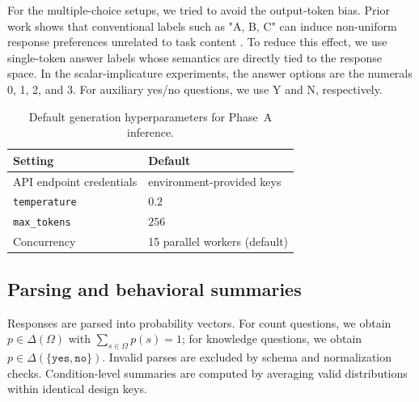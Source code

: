 \documentclass[11pt]{article}
\begin{document}
For the multiple-choice setups, we tried to avoid the output-token bias. Prior work shows that conventional
 labels such as "A, B, C" can induce non-uniform response preferences unrelated to task 
 content \cite{zheng_large_2023}. To reduce this effect, we use single-token answer labels whose 
 semantics are directly tied to the response space. In the scalar-implicature experiments, the answer 
 options are the numerals 0, 1, 2, and 3. For auxiliary yes/no questions, we use Y and N, respectively.


\begin{table}[t]

  \centering

  \footnotesize

  \setlength{\tabcolsep}{3pt}

  \renewcommand{\arraystretch}{0.92}

  \begin{tabularx}{\linewidth}{@{}lX@{}}

    \toprule

    \textbf{Setting} & \textbf{Default} \\

    \midrule

    API endpoint credentials & environment-provided keys \\

    \texttt{temperature} & $0.2$ \\

    \texttt{max\_tokens} & $256$ \\

    Concurrency & 15 parallel workers (default) \\

    \bottomrule

  \end{tabularx}

  \caption{Default generation hyperparameters for Phase~A inference.}

  \label{tab:inference_defaults}

\end{table}



\subsection{Parsing and behavioral summaries}

Responses are parsed into probability vectors. For count questions, we obtain $p\in\Delta(\Omega)$ with $\sum_{s\in\Omega}p(s)=1$; for knowledge questions, we obtain $p\in\Delta(\{\texttt{yes},\texttt{no}\})$. Invalid parses are excluded by schema and normalization checks. Condition-level summaries are computed by averaging valid distributions within identical design keys.
\end{document}
